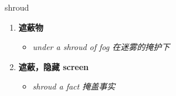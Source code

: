 
\begin{frame}
{\huge shroud}
\begin{center}
\begin{enumerate}\Large
  \item \textbf{遮蔽物}
  \begin{itemize}
    \item \em{\Large{under a shroud of fog 在迷雾的掩护下}}
  \end{itemize}
  \item \textbf{遮蔽，隐藏 screen}
  \begin{itemize}
    \item \em{\Large{shroud a fact 掩盖事实}}
  \end{itemize}
\end{enumerate}
\end{center}
\end{frame}
